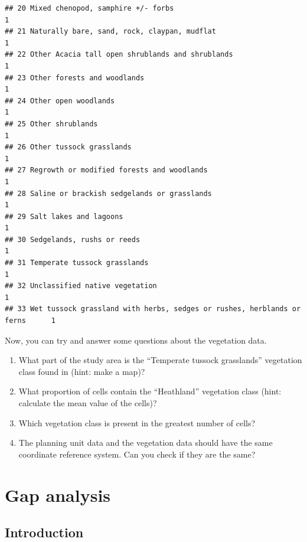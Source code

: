 \documentclass[
  12pt,
]{book}
\makeatletter
\providecommand{\tightlist}{%
  \setlength{\itemsep}{0pt}\setlength{\parskip}{0pt}}
\newenvironment{kframe}{%
\medskip{}
\setlength{\fboxsep}{.8em}
 \def\at@end@of@kframe{}%
 \ifinner\ifhmode%
  \def\at@end@of@kframe{\end{minipage}}%
  \begin{minipage}{\columnwidth}%
 \fi\fi%
 \def\FrameCommand##1{\hskip\@totalleftmargin \hskip-\fboxsep
 \colorbox{shadecolor}{##1}\hskip-\fboxsep
     \hskip-\linewidth \hskip-\@totalleftmargin \hskip\columnwidth}%
 \MakeFramed {\advance\hsize-\width
   \@totalleftmargin\z@ \linewidth\hsize
   \@setminipage}}%
 {\par\unskip\endMakeFramed%
 \at@end@of@kframe}
\newenvironment{rmdblock}[1]
  {
  \begin{itemize}
  \renewcommand{\labelitemi}{
    \raisebox{-.7\height}[0pt][0pt]{
      {\setkeys{Gin}{width=3em,keepaspectratio}\texttt{[image: images/\#1]}}
    }
  }
  \setlength{\fboxsep}{1em}
  \begin{kframe}
  \item
  }
  {
  \end{kframe}
  \end{itemize}
  }
\newenvironment{rmdquestion}
  {\begin{rmdblock}{question}}
  {\end{rmdblock}}
\makeatother
\begin{document}
\begin{verbatim}
## 20 Mixed chenopod, samphire +/- forbs                                          1
## 21 Naturally bare, sand, rock, claypan, mudflat                                1
## 22 Other Acacia tall open shrublands and shrublands                            1
## 23 Other forests and woodlands                                                 1
## 24 Other open woodlands                                                        1
## 25 Other shrublands                                                            1
## 26 Other tussock grasslands                                                    1
## 27 Regrowth or modified forests and woodlands                                  1
## 28 Saline or brackish sedgelands or grasslands                                 1
## 29 Salt lakes and lagoons                                                      1
## 30 Sedgelands, rushs or reeds                                                  1
## 31 Temperate tussock grasslands                                                1
## 32 Unclassified native vegetation                                              1
## 33 Wet tussock grassland with herbs, sedges or rushes, herblands or ferns      1
\end{verbatim}

Now, you can try and answer some questions about the vegetation data.

\begin{rmdquestion}
\begin{enumerate}
\def\labelenumi{\arabic{enumi}.}
\tightlist
\item
  What part of the study area is the ``Temperate tussock grasslands'' vegetation class found in (hint: make a map)?
\item
  What proportion of cells contain the ``Heathland'' vegetation class (hint: calculate the mean value of the cells)?
\item
  Which vegetation class is present in the greatest number of cells?
\item
  The planning unit data and the vegetation data should have the same coordinate reference system. Can you check if they are the same?
\end{enumerate}
\end{rmdquestion}

\hypertarget{gap-analysis}{%
\chapter{Gap analysis}\label{gap-analysis}}

\hypertarget{introduction-1}{%
\section{Introduction}\label{introduction-1}}
\end{document}
